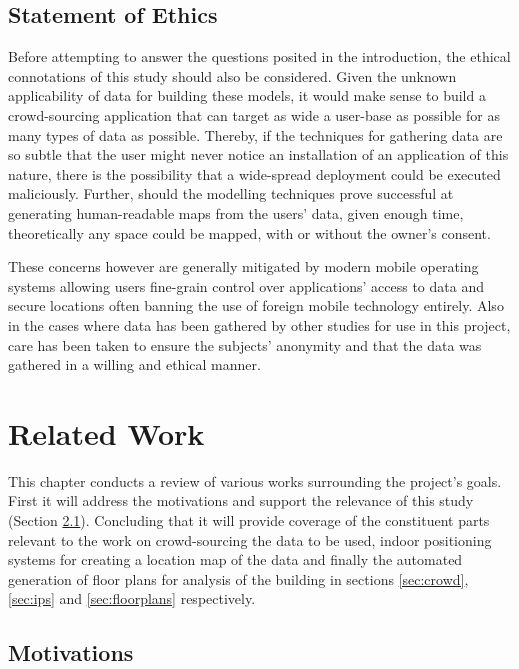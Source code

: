 \documentclass{UoYCSproject}
\begin{document}
        \section{Statement of Ethics}
                    
            Before attempting to answer the questions posited in the introduction, the ethical connotations of this study should also be considered. Given the unknown applicability of data for building these models, it would make sense to build a crowd-sourcing application that can target as wide a user-base as possible for as many types of data as possible. Thereby, if the techniques for gathering data are so subtle that the user might never notice an installation of an application of this nature, there is the possibility that a wide-spread deployment could be executed maliciously. Further, should the modelling techniques prove successful at generating human-readable maps from the users' data, given enough time, theoretically any space could be mapped, with or without the owner's consent.
            
            These concerns however are generally mitigated by modern mobile operating systems allowing users fine-grain control over applications' access to data and secure locations often banning the use of foreign mobile technology entirely. Also in the cases where data has been gathered by other studies for use in this project, care has been taken to ensure the subjects' anonymity and that the data was gathered in a willing and ethical manner.
        
	\chapter{Related Work}
    \label{chap:related}
	
		This chapter conducts a review of various works surrounding the project's goals. First it will address the motivations and support the relevance of this study (Section \ref{sec:motivations}). Concluding that it will provide coverage of the constituent parts relevant to the work on crowd-sourcing the data to be used, indoor positioning systems for creating a location map of the data and finally the automated generation of floor plans for analysis of the building in sections \ref{sec:crowd}, \ref{sec:ips} and \ref{sec:floorplans} respectively.
        
        \section{Motivations}
        \label{sec:motivations}
        
\end{document}
